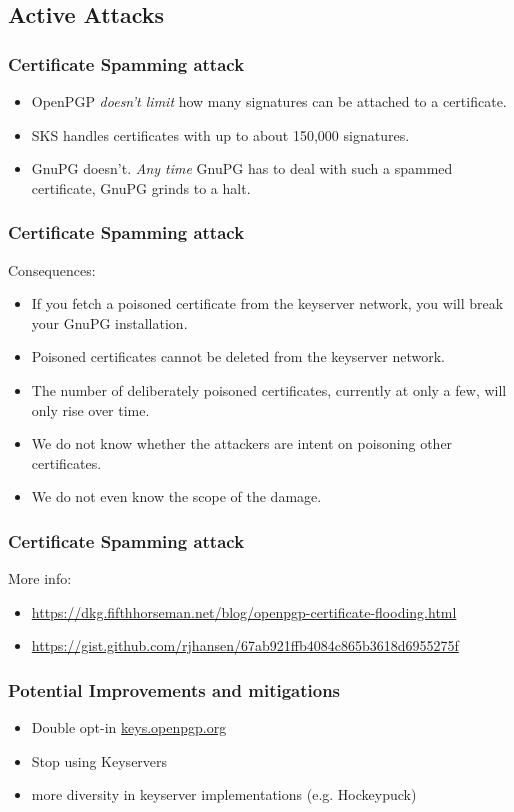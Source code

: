 \documentclass[aspectratio=1610,bigger,utf8]{beamer}
\begin{document}
\subsection{Active Attacks}

\begin{frame}
	\frametitle{Certificate Spamming attack}
	\begin{itemize}
		\item OpenPGP \emph{doesn't limit} how many signatures can be
			attached to a certificate.
		\item SKS handles certificates with up to about \alert{150,000
			signatures}.\pause
		\item GnuPG doesn't. \emph{Any time} GnuPG has to deal with
			such a spammed certificate, GnuPG
			\alert{grinds to a halt}.
	\end{itemize}
\end{frame}

\begin{frame}
	\frametitle{Certificate Spamming attack}
	Consequences:
	\begin{itemize}
		\item If you fetch a poisoned certificate from the keyserver
			network, you will break your GnuPG installation.
		\item Poisoned certificates cannot be deleted from the
			keyserver network.
		\item The number of deliberately poisoned certificates,
			currently at only a few, will only rise over time.
		\item We do not know whether the attackers are intent on
			poisoning other certificates.
		\item We do not even know the scope of the damage.
	\end{itemize}
\end{frame}
\begin{frame}
	\frametitle{Certificate Spamming attack}
	More info:
	\begin{itemize}
		\item \url{https://dkg.fifthhorseman.net/blog/openpgp-certificate-flooding.html}
		\item \url{https://gist.github.com/rjhansen/67ab921ffb4084c865b3618d6955275f}
	\end{itemize}
\end{frame}
\begin{frame}
	\frametitle{Potential Improvements and mitigations}
	\begin{itemize}
		\item Double opt-in \url{keys.openpgp.org}
		\item Stop using Keyservers
		\item more diversity in keyserver implementations (e.g.
			Hockeypuck)
	\end{itemize}
\end{frame}
\end{document}
